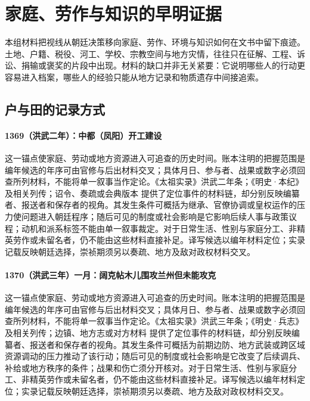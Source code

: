 \section{家庭、劳作与知识的早明证据}

本组材料把视线从朝廷决策移向家庭、劳作、环境与知识如何在文书中留下痕迹。土地、户籍、税役、河工、学校、宗教空间与地方灾情，往往只在征解、工程、诉讼、捐输或褒奖的片段中出现。材料的缺口并非无关紧要：它说明哪些人的行动更容易进入档案，哪些人的经验只能从地方记录和物质遗存中间接追索。

\subsection{户与田的记录方式}

\paragraph{1369（洪武二年）：中都（凤阳）开工建设} 这一锚点使家庭、劳动或地方资源进入可追查的历史时间。账本注明的把握范围是编年候选的年序可由官修与后出材料交叉；具体月日、参与者、战果或数字必须回查所列材料，不能将单一叙事当作定论。《太祖实录》洪武二年条；《明史·本纪》及相关列传；诏令、奏疏或会典版本 提供了定位事件的材料链，却分别反映编纂者、报送者和保存者的视角。其发生条件可概括为继承、官僚协调或皇权运作的压力使问题进入朝廷程序；随后可见的制度或社会影响是它影响后续人事与政策议程；动机和派系标签不能由单一叙事裁定。对于日常生活、性别与家庭分工、非精英劳作或未留名者，仍不能由这些材料直接补足。译写候选以编年材料定位；实录记载反映朝廷选择，崇祯期须另以奏疏、地方及敌对政权材料交叉。

\paragraph{1370（洪武三年）一月：阔克帖木儿围攻兰州但未能攻克} 这一锚点使家庭、劳动或地方资源进入可追查的历史时间。账本注明的把握范围是编年候选的年序可由官修与后出材料交叉；具体月日、参与者、战果或数字必须回查所列材料，不能将单一叙事当作定论。《太祖实录》洪武三年条；《明史·兵志》及相关列传；边镇、地方志或对方材料 提供了定位事件的材料链，却分别反映编纂者、报送者和保存者的视角。其发生条件可概括为前期边防、地方武装或跨区域资源调动的压力推动了该行动；随后可见的制度或社会影响是它改变了后续调兵、补给或地方秩序的条件；战果和伤亡须分开核对。对于日常生活、性别与家庭分工、非精英劳作或未留名者，仍不能由这些材料直接补足。译写候选以编年材料定位；实录记载反映朝廷选择，崇祯期须另以奏疏、地方及敌对政权材料交叉。

